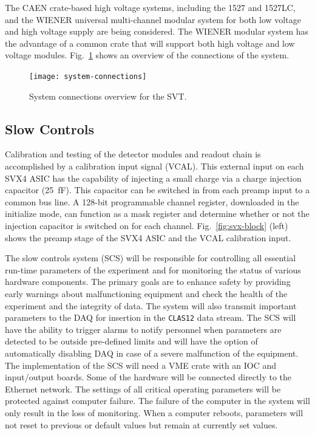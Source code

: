 The CAEN crate-based high voltage systems, including the 1527 and 1527LC, 
and the WIENER universal multi-channel modular system for both low voltage 
and high voltage supply are being considered.  The WIENER modular system 
has the advantage of a common crate that will support both high voltage 
and low voltage modules.  Fig.~\ref{fig:system-connections} shows an 
overview of the connections of the system.

\begin{figure}[htbp]
\texttt{[image: system-connections]}
\caption{\small{System connections overview for the SVT.}}
\label{fig:system-connections}
\end{figure}

\subsection{Slow Controls}

Calibration and testing of the detector modules and readout chain is 
accomplished by a calibration input signal (VCAL).  This external input 
on each SVX4 ASIC has the capability of injecting a small charge via a  
charge injection capacitor (25~fF).  This capacitor can be switched in 
from each preamp input to a common bus line.  A 128-bit programmable 
channel register, downloaded in the initialize mode, can function as a 
mask register and determine whether or not the injection capacitor is 
switched on for each channel.  Fig.~\ref{fig:svx-block} (left) shows the 
preamp stage of the SVX4 ASIC and the VCAL calibration input.

The slow controls system (SCS) will be responsible for controlling all 
essential run-time parameters of the experiment and for monitoring the 
status of various hardware components.  The primary goals are to enhance 
safety by providing early warnings about malfunctioning equipment and check 
the health of the experiment and the integrity of data.  The system will 
also transmit important parameters to the DAQ for insertion in the 
{\tt CLAS12} data stream.  The SCS will have the ability to trigger alarms 
to notify personnel when parameters are detected to be outside pre-defined 
limits and will have the option of automatically disabling DAQ in case of 
a severe malfunction of the equipment.  The implementation of the SCS will 
need a VME crate with an IOC and input/output boards.  Some of the hardware 
will be connected directly to the Ethernet network.  The settings of all 
critical operating parameters will be protected against computer failure.  
The failure of the computer in the system will only result in the loss of 
monitoring.  When a computer reboots, parameters will not reset to 
previous or default values but remain at currently set values.

